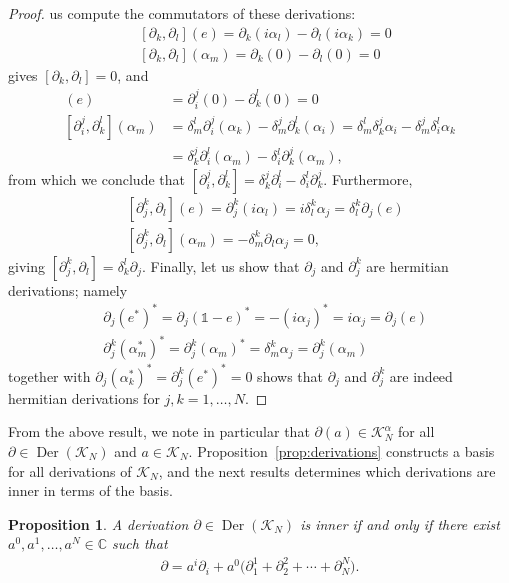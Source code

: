 \documentclass{amsart}
\newcommand{\complex}{\mathbb{C}}
\newcommand{\paraa}[1]{\big(#1\big)}
\newtheorem{proposition}[theorem]{Proposition}
\theoremstyle{definition}
\theoremstyle{remark}
\numberwithin{equation}{section}
\newcommand{\K}{\mathcal{K}}
\renewcommand{\mid}{\mathds{1}}
\newcommand{\KN}{\K_N}
\newcommand{\KaN}{\K^\alpha_N}
\renewcommand{\d}{\partial}
\newcommand{\Der}{\operatorname{Der}}
\begin{document}
\begin{proof}
  us compute the commutators of these derivations:
  \begin{align*}
    &[\d_k,\d_l](e) = \d_k(i\alpha_l) - \d_l(i\alpha_k) = 0\\
    &[\d_k,\d_l](\alpha_m) = \d_k(0) - \d_l(0)=0
  \end{align*}
  gives $[\d_k,\d_l]=0$, and
  \begin{align*}
    [\d_i^j,\d_{k}^l](e) &= \d_i^j(0)-\d_k^l(0) = 0\\
    [\d_i^j,\d_k^l](\alpha_m) &= \delta_m^l\d_i^j(\alpha_k)-\delta_m^j\d_k^l(\alpha_i)
      =\delta_m^l\delta_k^j\alpha_i-\delta_m^j\delta_i^l\alpha_k\\
                         &= \delta_k^j\d_i^l(\alpha_m)-\delta_i^l\d_k^j(\alpha_m),
  \end{align*}
  from which we conclude that $[\d_i^j,\d_k^l]=\delta_k^j\d_i^l-\delta_i^l\d_k^j$. Furthermore,
  \begin{align*}
    &[\d_j^k,\d_l](e) = \d_j^k(i\alpha_l) = i\delta_l^k\alpha_j = \delta^k_l\d_j(e)\\
    &[\d_j^k,\d_l](\alpha_m) = -\delta_m^k\d_l\alpha_j = 0,
  \end{align*}
  giving $[\d_j^k,\d_l] = \delta_k^l\d_j$. Finally, let us show that
  $\d_j$ and $\d_j^k$ are hermitian derivations; namely
  \begin{align*}
    &\d_j(e^\ast)^\ast = \d_j(\mid-e)^\ast=-(i\alpha_j)^\ast = i\alpha_j = \d_j(e)\\
    &\d_j^k(\alpha_m^\ast)^\ast = \d_j^k(\alpha_m)^\ast = \delta^k_m\alpha_j = \d_j^k(\alpha_m)
  \end{align*}
  together with $\d_j(\alpha_k^\ast)^\ast=\d_j^k(e^\ast)^\ast = 0$
  shows that $\d_j$ and $\d_j^k$ are indeed hermitian derivations for
  $j,k=1,\ldots,N$.
\end{proof}

\noindent
From the above result, we note in particular that $\d(a)\in\KaN$ for
all $\d\in\Der(\KN)$ and $a\in\KN$. Proposition~\ref{prop:derivations}
constructs a basis for all derivations of $\KN$, and the next results
determines which derivations are inner in terms of the basis.

\begin{proposition}
  A derivation $\d\in\Der(\KN)$ is inner if and only if there exist
  $a^0,a^1,\ldots,a^N\in\complex$ such that
  \begin{align}\label{eq:inner.derivation}
    \d = a^i\d_i + a^0\paraa{\d_1^1+ \d_2^2+ \cdots + \d_N^N}.
  \end{align}
\end{proposition}
\end{document}
